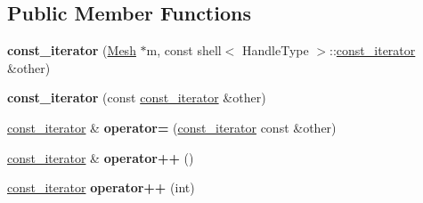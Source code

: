 \subsection*{Public Member Functions}
\begin{DoxyCompactItemize}
\item 
\hypertarget{classINMOST_1_1Storage_1_1reference__array_1_1const__iterator_aee049aa18a46f40ef1852e2c46d59d02}{{\bfseries const\-\_\-iterator} (\hyperlink{classINMOST_1_1Mesh}{Mesh} $\ast$m, const shell$<$ Handle\-Type $>$\-::\hyperlink{classINMOST_1_1Storage_1_1reference__array_1_1const__iterator}{const\-\_\-iterator} \&other)}\label{classINMOST_1_1Storage_1_1reference__array_1_1const__iterator_aee049aa18a46f40ef1852e2c46d59d02}

\item 
\hypertarget{classINMOST_1_1Storage_1_1reference__array_1_1const__iterator_a95ce64fb4f1d6ad924dfae52fa9a9faa}{{\bfseries const\-\_\-iterator} (const \hyperlink{classINMOST_1_1Storage_1_1reference__array_1_1const__iterator}{const\-\_\-iterator} \&other)}\label{classINMOST_1_1Storage_1_1reference__array_1_1const__iterator_a95ce64fb4f1d6ad924dfae52fa9a9faa}

\item 
\hypertarget{classINMOST_1_1Storage_1_1reference__array_1_1const__iterator_a14703c26f3f90ec5eb0fa6a08fcd3789}{\hyperlink{classINMOST_1_1Storage_1_1reference__array_1_1const__iterator}{const\-\_\-iterator} \& {\bfseries operator=} (\hyperlink{classINMOST_1_1Storage_1_1reference__array_1_1const__iterator}{const\-\_\-iterator} const \&other)}\label{classINMOST_1_1Storage_1_1reference__array_1_1const__iterator_a14703c26f3f90ec5eb0fa6a08fcd3789}

\item 
\hypertarget{classINMOST_1_1Storage_1_1reference__array_1_1const__iterator_ade06e603cdc29abc2b86fabeb8741578}{\hyperlink{classINMOST_1_1Storage_1_1reference__array_1_1const__iterator}{const\-\_\-iterator} \& {\bfseries operator++} ()}\label{classINMOST_1_1Storage_1_1reference__array_1_1const__iterator_ade06e603cdc29abc2b86fabeb8741578}

\item 
\hypertarget{classINMOST_1_1Storage_1_1reference__array_1_1const__iterator_ae6602b970a8e782aab63d05d3b2786b7}{\hyperlink{classINMOST_1_1Storage_1_1reference__array_1_1const__iterator}{const\-\_\-iterator} {\bfseries operator++} (int)}\label{classINMOST_1_1Storage_1_1reference__array_1_1const__iterator_ae6602b970a8e782aab63d05d3b2786b7}


\end{DoxyCompactItemize}
